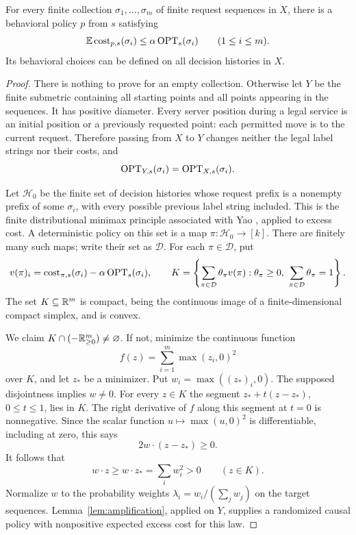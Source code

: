 \begin{lemma}
\label{lem:finite-minimax}
For every finite collection $\sigma_1,\ldots,\sigma_m$ of finite
request sequences in $X$, there is a behavioral policy $p$ from $s$
satisfying
\begin{equation}
 \mathbb E\operatorname{cost}_{p,s}(\sigma_i)\le\alpha\operatorname{OPT}_s(\sigma_i)
       \qquad(1\le i\le m).
 \label{eq:finite-family-bound}
\end{equation}
Its behavioral choices can be defined on all decision histories in $X$.
\end{lemma}

\begin{proof}
There is nothing to prove for an empty collection.  Otherwise let $Y$
be the finite submetric containing all starting points and all points
appearing in the sequences.  It has positive diameter.  Every server
position during a legal service is an initial position or a previously
requested point: each permitted move is to the current request.
Therefore passing from $X$ to $Y$ changes neither the legal label
strings nor their costs, and
\begin{equation}
 \operatorname{OPT}_{Y,s}(\sigma_i)=\operatorname{OPT}_{X,s}(\sigma_i).
 \label{eq:finite-restriction-optimum}
\end{equation}

Let $\mathcal H_0$ be the finite set of decision histories whose request
prefix is a nonempty prefix of some $\sigma_i$, with every possible
previous label string included.  This is the finite distributional minimax principle associated with
Yao \cite{Yao77}, applied to excess cost. A deterministic policy on this set is
a map $\pi:\mathcal H_0\to[k]$.  There are finitely many such maps;
write their set as $\mathcal D$.  For each $\pi\in\mathcal D$, put
\[
 v(\pi)_i=\operatorname{cost}_{\pi,s}(\sigma_i)-\alpha\operatorname{OPT}_s(\sigma_i),
 \qquad
 K=\left\{\sum_{\pi\in\mathcal D}\theta_\pi v(\pi):
       \theta_\pi\ge0,\ \sum_{\pi\in\mathcal D}\theta_\pi=1\right\}.
\]
The set $K\subseteq\mathbb R^m$ is compact, being the continuous image of a
finite-dimensional compact simplex, and is convex.

We claim $K\cap(-\mathbb R_{\ge0}^m)\ne\varnothing$.  If not, minimize the
continuous function
\[
 f(z)=\sum_{i=1}^m\max(z_i,0)^2
\]
over $K$, and let $z_*$ be a minimizer.  Put
$w_i=\max((z_*)_i,0)$.  The supposed disjointness implies $w\ne0$.
For every $z\in K$ the segment $z_*+t(z-z_*)$, $0\le t\le1$, lies in
$K$.  The right derivative of $f$ along this segment at $t=0$ is
nonnegative.  Since the scalar function $u\mapsto\max(u,0)^2$ is
differentiable, including at zero, this says
\[
 2w\mathbin{\cdot}(z-z_*)\ge0.
\]
It follows that
\begin{equation}
 w\mathbin{\cdot}z\ge w\mathbin{\cdot}z_*
    =\sum_i w_i^2>0\qquad(z\in K).
 \label{eq:finite-separation}
\end{equation}
Normalize $w$ to the probability weights
$\lambda_i=w_i/(\sum_jw_j)$ on the target sequences.
Lemma~\ref{lem:amplification}, applied on $Y$, supplies a randomized
causal policy with nonpositive expected excess cost for this law.


\end{proof}
